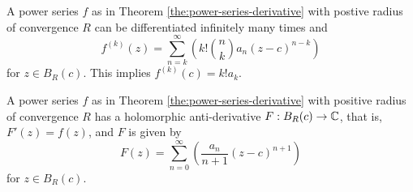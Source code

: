 \begin{corollary}
    A power series $f$ as in Theorem \ref{the:power-series-derivative} with postive radius of convergence $R$ can be differentiated infinitely many times and
    \[ f^{(k)}(z) = \sum_{n = k}^\infty \left(k! \binom{n}{k} a_n (z - c)^{n - k}\right) \]
    for $z \in B_R(c)$.
    This implies $f^{(k)}(c) = k! a_k$.
\end{corollary}

\begin{corollary}
    A power series $f$ as in Theorem \ref{the:power-series-derivative} with positive radius of convergence $R$ has a holomorphic anti-derivative $F: B_R(c) \to \mathbb{C}$, 
    that is, $F'(z) = f(z)$,
    and $F$ is given by
    \[ F(z) = \sum_{n = 0}^\infty \left(\frac{a_n}{n + 1} (z - c)^{n + 1}\right) \]
    for $z \in B_R(c)$.
\end{corollary}

